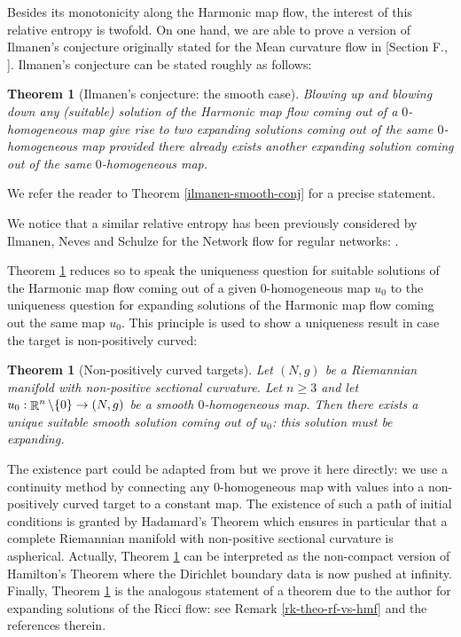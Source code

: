 \documentclass[a4paper,11pt,reqno]{amsart}
\newtheorem{theo}[defn]{Theorem}
\def\R{\mathop{\rm \mathbb{R}}\nolimits}
\begin{document}
Besides its monotonicity along the Harmonic map flow, the interest of this relative entropy is twofold. On one hand, we are able to prove a version of Ilmanen's conjecture originally stated for the Mean curvature flow in [Section F., \cite{Ilm-Lec-Not}]. Ilmanen's conjecture can be stated roughly as follows:
\begin{theo}[Ilmanen's conjecture: the smooth case]\label{Ilm-conj-rough}
 Blowing up and blowing down any (suitable) solution of the Harmonic map flow coming out of a $0$-homogeneous map give rise to two expanding solutions coming out of the same $0$-homogeneous map provided there already exists another expanding solution coming out of the same $0$-homogeneous map.
 \end{theo}
 We refer the reader to Theorem \ref{ilmanen-smooth-conj} for a precise statement. 
 
We notice that a similar relative entropy has been previously considered by Ilmanen, Neves and Schulze for the Network flow for regular networks: \cite{Ilm-Nev-Sch}.

 Theorem \ref{Ilm-conj-rough} reduces so to speak the uniqueness question for suitable solutions of the Harmonic map flow coming out of a given $0$-homogeneous map $u_0$ to the uniqueness question for expanding solutions of the Harmonic map flow coming out the same map $u_0$.
 This principle is used to show a uniqueness result in case the target is non-positively curved: 
 
 \begin{theo}[Non-positively curved targets]\label{theo-non-pos-cur-tar-intro}
Let $(N,g)$ be a Riemannian manifold with non-positive sectional curvature.
Let $n\geq 3$ and let $u_0:\R^n\setminus\{0\}\rightarrow (N,g)$ be a smooth $0$-homogeneous map. Then there exists a unique suitable smooth solution coming out of $u_0$: this solution must be expanding.
\end{theo}
The existence part could be adapted from \cite{Der-Lam-HMF} but we prove it here directly: we use a continuity method by connecting any $0$-homogeneous map with values into a non-positively curved target to a constant map. The existence of such a path of initial conditions is granted by Hadamard's Theorem which ensures in particular that a complete Riemannian manifold with non-positive sectional curvature is aspherical. Actually, Theorem \ref{theo-non-pos-cur-tar-intro} can be interpreted as the non-compact version of Hamilton's Theorem \cite{Ham-HMF-Bdy} where the Dirichlet boundary data is now pushed at infinity. Finally, Theorem \ref{theo-non-pos-cur-tar-intro} is the analogous statement of a theorem due to the author for expanding solutions of the Ricci flow: see Remark \ref{rk-theo-rf-vs-hmf} and the references therein.
\end{document}
